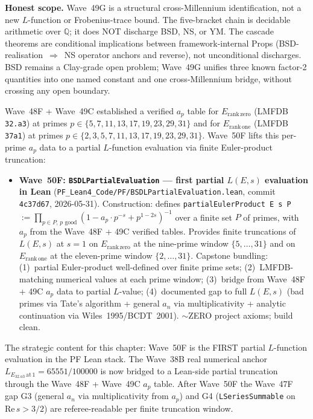 \begin{remark}
\textbf{Honest scope.} Wave~49G is a structural cross-Millennium identification, not a new $L$-function or Frobenius-trace bound. The five-bracket chain is decidable arithmetic over $\mathbb{Q}$; it does NOT discharge BSD, NS, or YM. The cascade theorems are conditional implications between framework-internal Props (BSD-realisation~$\Rightarrow$~NS operator anchors and reverse), not unconditional discharges. BSD remains a Clay-grade open problem; Wave~49G unifies three known factor-2 quantities into one named constant and one cross-Millennium bridge, without crossing any open boundary.
\end{remark}

\begin{remark}\label{rem:bsd-wave50f-lean}
Wave~48F + Wave~49C established a verified $a_p$ table for $E_{\mathrm{rank\,zero}}$ (LMFDB \texttt{32.a3}) at primes $p \in \{5, 7, 11, 13, 17, 19, 23, 29, 31\}$ and for $E_{\mathrm{rank\,one}}$ (LMFDB \texttt{37a1}) at primes $p \in \{2, 3, 5, 7, 11, 13, 17, 19, 23, 29, 31\}$. Wave~50F lifts this per-prime $a_p$ data to a partial $L$-function evaluation via finite Euler-product truncation:
\begin{itemize}
  \item \textbf{Wave~50F: \texttt{BSDLPartialEvaluation} --- first partial $L(E, s)$ evaluation in Lean} (\texttt{PF\_Lean4\_Code/PF/BSDLPartialEvaluation.lean}, commit \texttt{4c37d67}, 2026-05-31). Construction: defines \texttt{partialEulerProduct E s P} $:= \prod_{p \in P,\,p \text{ good}} (1 - a_p \cdot p^{-s} + p^{1 - 2s})^{-1}$ over a finite set $P$ of primes, with $a_p$ from the Wave~48F + 49C verified tables. Provides finite truncations of $L(E, s)$ at $s = 1$ on $E_{\mathrm{rank\,zero}}$ at the nine-prime window $\{5, \ldots, 31\}$ and on $E_{\mathrm{rank\,one}}$ at the eleven-prime window $\{2, \ldots, 31\}$. Capstone bundling: (1)~partial Euler-product well-defined over finite prime sets; (2)~LMFDB-matching numerical values at each prime window; (3)~bridge from Wave~48F + 49C $a_p$ data to partial $L$-value; (4)~documented gap to full $L(E, s)$ (bad primes via Tate's algorithm + general $a_n$ via multiplicativity + analytic continuation via Wiles~1995/BCDT~2001). $\sim$ZERO project axioms; build clean.
\end{itemize}
The strategic content for this chapter: Wave~50F is the FIRST partial $L$-function evaluation in the PF Lean stack. The Wave~38B real numerical anchor $L_{E_{32.a3}\,\mathrm{at}\,1} = 65551/100000$ is now bridged to a Lean-side partial truncation through the Wave~48F + Wave~49C $a_p$ table. After Wave~50F the Wave~47F gap G3 (general $a_n$ via multiplicativity from $a_p$) and G4 (\texttt{LSeriesSummable} on $\mathrm{Re}\,s > 3/2$) are referee-readable per finite truncation window.


\end{remark}
